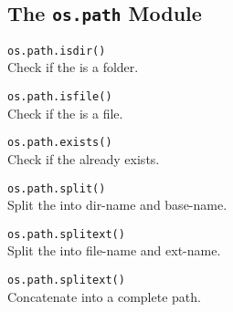 \subsection*{The \texttt{os.path} Module}

\hangpar \texttt{os.path.isdir(}\texttt{)} \\
Check if the  is a folder.

\hangpar \texttt{os.path.isfile(}\texttt{)} \\
Check if the  is a file.

\hangpar \texttt{os.path.exists(}\texttt{)} \\
Check if the  already exists.

\hangpar \texttt{os.path.split(}\texttt{)} \\
Split the  into dir-name and base-name.

\hangpar \texttt{os.path.splitext(}\texttt{)} \\
Split the  into file-name and ext-name.

\hangpar \texttt{os.path.splitext(}\texttt{)} \\
Concatenate  into a complete path.

